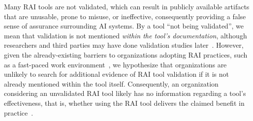 Many RAI tools are not validated, which can result in publicly available artifacts that are unusable, prone to misuse, or ineffective, consequently providing a false sense of assurance surrounding AI systems.
By a tool ``not being validated'', we mean that validation is not mentioned \emph{within the tool's documentation}, although researchers and third parties may have done validation studies later~\citep[e.g.,][]{deng2022exploring, kaur2020interpreting, nunes2022using}.
However, given the already-existing barriers to organizations adopting RAI practices, such as a fast-paced work environment~\cite{berman2024scoping, kaur2020interpreting, Tenney2020}, we hypothesize that organizations are unlikely to search for additional evidence of RAI tool validation if it is not already mentioned within the tool itself. 
Consequently, an organization considering an unvalidated RAI tool likely has no information regarding a tool’s effectiveness, that is, whether using the RAI tool delivers the claimed benefit in practice~\cite{cartwright2009thing}.


